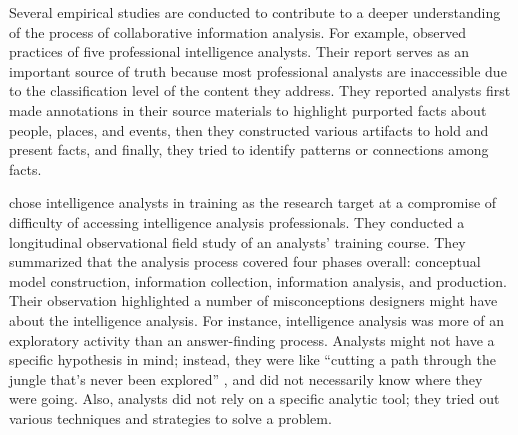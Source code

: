 Several empirical studies are conducted to contribute to a deeper understanding
of the process of collaborative information analysis. For example, \cite{Chin2009} observed practices of five professional intelligence analysts. Their report serves as an important source of truth because most professional analysts are inaccessible due to the classification level of
the content they address. They reported analysts first made annotations in their
source materials to highlight purported facts about people, places, and events,
then they constructed various artifacts to hold and present facts, and finally,
they tried to identify patterns or connections among facts. 

\cite{Kang2012b} chose intelligence analysts in training as the research target at a compromise of difficulty of accessing intelligence analysis professionals. They conducted a longitudinal observational field study of an analysts' training course. They summarized that the analysis process covered four phases
overall: conceptual model construction, information collection, information
analysis, and production. Their observation highlighted a number of
misconceptions designers might have about the intelligence analysis. For
instance, intelligence analysis was more of an exploratory activity than an
answer-finding process. Analysts might not have a specific hypothesis in mind;
instead, they were like ``cutting a path through the jungle that’s never been
explored'' \citep[p.145]{Kang2012b}, and did not necessarily know where they
were going. Also, analysts did not rely
on a specific analytic tool; they tried out various techniques and strategies to
solve a problem. 

